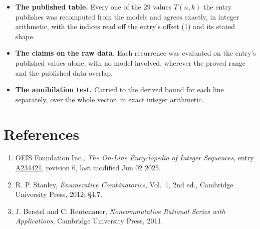 \documentclass[11pt]{article}
\theoremstyle{definition}
\begin{document}
\begin{itemize}

\item {\bfseries The published table.} Every one of the 29 values $T(n,k)$ the entry publishes was recomputed from the models and agrees exactly, in integer arithmetic, with the indices read off the entry's offset (1) and its stated shape.

\item {\bfseries The claims on the raw data.} Each recurrence was evaluated on the entry's published values alone, with no model involved, wherever the proved range and the published data overlap.

\item {\bfseries The annihilation test.} Carried to the derived bound for each line separately, over the whole vector, in exact integer arithmetic.

\end{itemize}

\section{References}

\begin{enumerate}

\item OEIS Foundation Inc., \emph{The On-Line Encyclopedia of Integer Sequences}, entry \href{https://oeis.org/A234421}{A234421}, revision 6, last modified Jun 02 2025.

\item R. P. Stanley, \emph{Enumerative Combinatorics}, Vol.~1, 2nd ed., Cambridge University Press, 2012; \S4.7.

\item J. Berstel and C. Reutenauer, \emph{Noncommutative Rational Series with Applications}, Cambridge University Press, 2011.

\end{enumerate}
\end{document}

